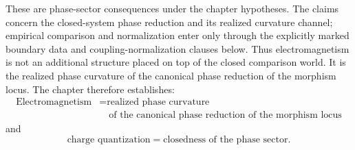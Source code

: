 These are phase-sector consequences under the chapter hypotheses.  The
claims concern the closed-system phase reduction and its realized
curvature channel; empirical comparison and normalization enter only
through the explicitly marked boundary data and coupling-normalization
clauses below.
Thus electromagnetism is not an additional structure placed on top of
the closed comparison world.
It is the realized phase curvature of the canonical phase reduction of
the morphism locus.
\medskip
The chapter therefore establishes:
\[
	\boxed{
		\begin{aligned}
			\text{Electromagnetism}
				&=
			\text{realized phase curvature}
			\\
				&\quad
			\text{of the canonical phase reduction of the morphism locus}
		\end{aligned}
	}
\]
and
\[
	\boxed{
		\text{charge quantization}=
		\text{closedness of the phase sector}.
	}
\]
